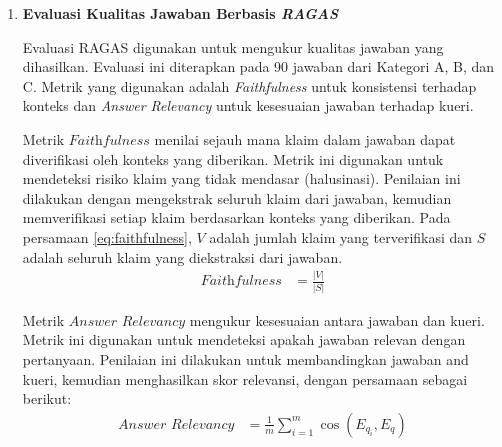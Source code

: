 \begin{enumerate}[label=\textbf{\arabic*.}, leftmargin=*, itemsep=10pt, listparindent=0.75cm]
\begin{enumerate}[label=\textbf{\alph*.}, leftmargin=0.75cm, itemsep=4pt, listparindent=0.75cm]
                    Metrik $\textit{Hit@K}$ \citep{manning2008introduction} digunakan untuk mengukur proporsi kueri yang berhasil menemukan paling tidak satu dokumen relevan dalam $K$ peringkat teratas. Metrik ini penting karena pengguna biasanya hanya melihat sejumlah kecil hasil pertama. Pada persamaan \eqref{eq:hit_k}, $Q_{\text{relevan@}K}$ adalah himpunan kueri yang memiliki dokumen relevan pada $K$ peringkat teratas.
                    \begin{align}
                        \textit{Hit@K} & = \frac{|Q_{\text{relevan@}K}|}{|Q|} \label{eq:hit_k}
                    \end{align}

              \item \textbf{Evaluasi Kualitas Jawaban Berbasis \textit{RAGAS}}

                    Evaluasi RAGAS digunakan untuk mengukur kualitas jawaban yang dihasilkan. Evaluasi ini diterapkan pada 90 jawaban dari Kategori A, B, dan C. Metrik yang digunakan adalah \textit{Faithfulness} untuk konsistensi terhadap konteks dan \textit{Answer Relevancy} untuk kesesuaian jawaban terhadap kueri.

                    Metrik $\textit{Faithfulness}$ \citep{es-etal-2024-ragas} menilai sejauh mana klaim dalam jawaban dapat diverifikasi oleh konteks yang diberikan. Metrik ini digunakan untuk mendeteksi risiko klaim yang tidak mendasar (halusinasi). Penilaian ini dilakukan dengan mengekstrak seluruh klaim dari jawaban, kemudian memverifikasi setiap klaim berdasarkan konteks yang diberikan. Pada persamaan \eqref{eq:faithfulness}, $V$ adalah jumlah klaim yang terverifikasi dan $S$ adalah seluruh klaim yang diekstraksi dari jawaban.
                    \begin{align}
                        \textit{Faithfulness} & = \frac{|V|}{|S|} \label{eq:faithfulness}
                    \end{align}

                    Metrik $\textit{Answer Relevancy}$ \citep{es-etal-2024-ragas} mengukur kesesuaian antara jawaban dan kueri. Metrik ini digunakan untuk mendeteksi apakah jawaban relevan dengan pertanyaan. Penilaian ini dilakukan untuk membandingkan jawaban and kueri, kemudian menghasilkan skor relevansi, dengan persamaan sebagai berikut:
                    \begin{align}
                        \textit{Answer Relevancy} & = \frac{1}{m} \sum_{i=1}^{m} \cos(E_{q_i}, E_q) \label{eq:answer_relevancy}
                    \end{align}


\end{enumerate}
\end{enumerate}
